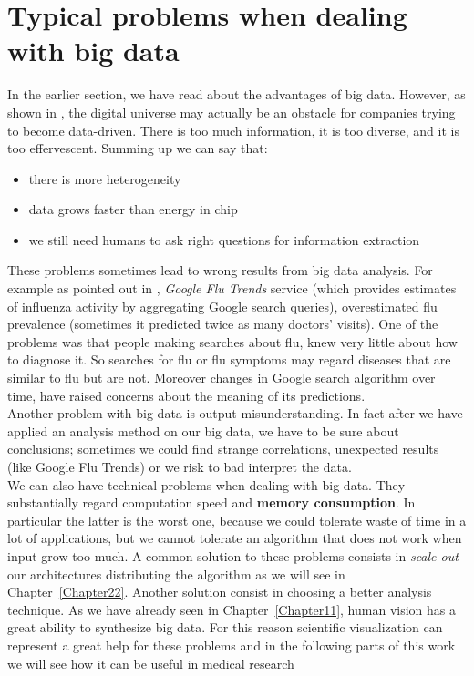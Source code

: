 \section{Typical problems when dealing with big data}\label{sec12:bigDataProblems}

In the earlier section, we have read about the advantages of big data. However, as shown in \cite{EMC1}, the digital universe may actually be an obstacle for companies trying to become data-driven. There is too much information, it is too diverse, and it is too effervescent. Summing up we can say that:
\begin{itemize}
 \item there is more heterogeneity
 \item data grows faster than energy in chip
 \item we still need humans to ask right questions for information extraction
\end{itemize}

These problems sometimes lead to wrong results from big data analysis.
For example as pointed out in \cite{Lazer}, \textit{Google Flu Trends} service (which provides estimates of influenza activity by aggregating Google search queries), overestimated flu prevalence (sometimes it predicted twice as many doctors' visits). One of the problems was that people making searches about flu, knew very little about how to diagnose it. So searches for flu or flu symptoms may regard diseases that are similar to flu but are not. Moreover changes in Google search algorithm over time, have raised concerns about the meaning of its predictions.\\

Another problem with big data is output misunderstanding. In fact after we have applied an analysis method on our big data, we have to be sure about conclusions; sometimes we could find strange correlations, unexpected results (like Google Flu Trends) or we risk to bad interpret the data.\\

We can also have technical problems when dealing with big data. They substantially regard computation speed and \textbf{memory consumption}. In particular the latter is the worst one, because we could tolerate waste of time in a lot of applications, but we cannot tolerate an algorithm that does not work when input grow too much. A common solution to these problems consists in \textit{scale out} our architectures distributing the algorithm as we will see in Chapter~\ref{Chapter22}. Another solution consist in choosing a better analysis technique. As we have already seen in Chapter~\ref{Chapter11}, human vision has a great ability to synthesize big data. For this reason scientific visualization can represent a great help for these problems and in the following parts of this work we will see how it can be useful in medical research

